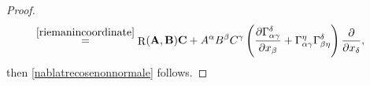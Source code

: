 \documentclass[11pt]{amsart}
\newcommand{\A}{\mathbf{A}}
\newcommand{\B}{\mathbf{B}}
\newcommand{\C}{\mathbf{C}}
\DeclareMathOperator{\R}{R}
\theoremstyle{definition}
\theoremstyle{remark}
\numberwithin{equation}{section}
\begin{document}
\begin{proof}
\begin{equation*}
\begin{split}
     &\overset{\eqref{riemanincoordinate}}{=}\R(\A ,\B )\C +A^\alpha B^\beta C^\gamma\left(\frac{\partial\Gamma_{\alpha\gamma}^\delta}{\partial x_\beta}+\Gamma_{\alpha\gamma}^\eta\Gamma_{\beta\eta}^\delta\right)\frac{\partial}{\partial x_\delta},
\end{split}
\end{equation*}
then \eqref{nablatrecosenonnormale} follows. 

\end{proof}
\end{document}

